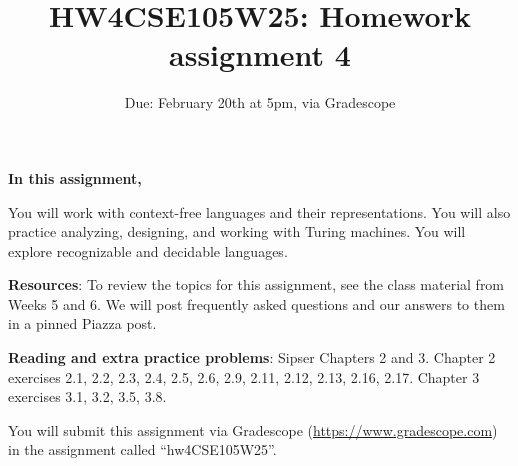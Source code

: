 

\title{HW4CSE105W25: Homework assignment 4}
\date{Due: February 20th at 5pm, via Gradescope}


\maketitle
\thispagestyle{fancy}

{\bf In this assignment,}

You will work with context-free languages and their representations.
You will also practice analyzing, designing, and working with Turing machines.
You will explore recognizable and decidable languages.

{\bf Resources}: To review the topics 
for this assignment, see the class material from Weeks 5 and 6.
We will post frequently asked questions and our answers to them in a 
pinned Piazza post. 

{\bf Reading and extra practice problems}:  
Sipser Chapters 2 and 3.
Chapter 2 exercises 2.1, 2.2, 2.3, 2.4, 2.5, 2.6, 2.9, 2.11, 2.12, 2.13, 2.16, 2.17.
Chapter 3 exercises 3.1, 3.2, 3.5, 3.8.

\instructions

You will submit this assignment via Gradescope
(\href{https://www.gradescope.com}{https://www.gradescope.com}) 
in the assignment called ``hw4CSE105W25''.


